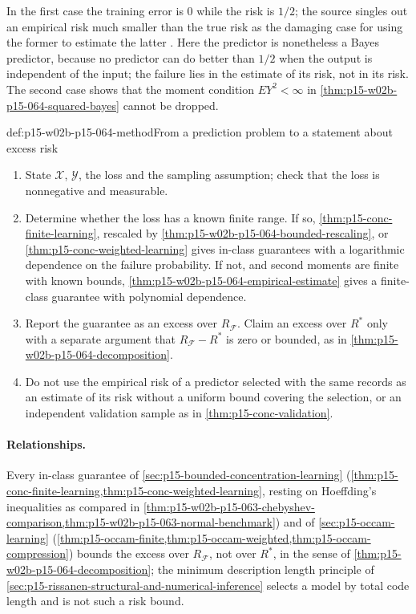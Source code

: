 In the first case the training error is \(0\) while the risk is \(1/2\); the
source singles out an empirical risk much smaller than the true risk as the
damaging case for using the former to estimate the latter
\cite[Section~2.3, p.~6]{LuxburgScholkopf2008Author}. Here the predictor is
nonetheless a Bayes predictor, because no predictor can do better than
\(1/2\) when the output is independent of the input; the failure lies in the
estimate of its risk, not in its risk. The second case shows that the
moment condition \(EY^2<\infty\) in
\cref{thm:p15-w02b-p15-064-squared-bayes} cannot be dropped.

\begin{hbmethod}{def:p15-w02b-p15-064-method}{From a prediction problem to a statement about excess risk}
\begin{enumerate}
\item State \(\mathcal X\), \(\mathcal Y\), the loss and the sampling
      assumption; check that the loss is nonnegative and measurable.
\item Determine whether the loss has a known finite range. If so,
      \cref{thm:p15-conc-finite-learning}, rescaled by
      \cref{thm:p15-w02b-p15-064-bounded-rescaling}, or
      \cref{thm:p15-conc-weighted-learning} gives in-class guarantees with
      a logarithmic dependence on the failure probability. If not, and
      second moments are finite with known bounds,
      \cref{thm:p15-w02b-p15-064-empirical-estimate} gives a finite-class
      guarantee with polynomial dependence.
\item Report the guarantee as an excess over \(R_{\mathcal F}\). Claim an
      excess over \(R^{*}\) only with a separate argument that
      \(R_{\mathcal F}-R^{*}\) is zero or bounded, as in
      \cref{thm:p15-w02b-p15-064-decomposition}.
\item Do not use the empirical risk of a predictor selected with the same
      records as an estimate of its risk without a uniform bound covering
      the selection, or an independent validation sample as in
      \cref{thm:p15-conc-validation}.
\end{enumerate}
\end{hbmethod}

\paragraph{Relationships.}
Every in-class guarantee of \cref{sec:p15-bounded-concentration-learning}
(\cref{thm:p15-conc-finite-learning,thm:p15-conc-weighted-learning}, resting
on Hoeffding's inequalities as compared in
\cref{thm:p15-w02b-p15-063-chebyshev-comparison,thm:p15-w02b-p15-063-normal-benchmark})
and of \cref{sec:p15-occam-learning}
(\cref{thm:p15-occam-finite,thm:p15-occam-weighted,thm:p15-occam-compression})
bounds the excess over \(R_{\mathcal F}\), not over \(R^{*}\), in the sense
of \cref{thm:p15-w02b-p15-064-decomposition}; the minimum description length
principle of \cref{sec:p15-rissanen-structural-and-numerical-inference}
selects a model by total code length and is not such a risk bound.
